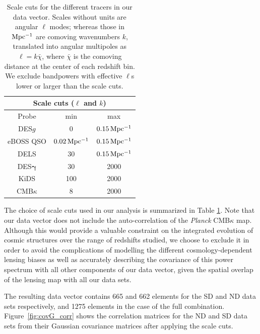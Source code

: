\documentclass[a4paper,11pt]{article}
\newcommand{\shear}{\boldsymbol{\gamma}}
\newcommand{\cmbk}{CMB$\kappa$\xspace}
\newcommand{\desgc}{DES$g$\xspace}
\newcommand{\deswl}{DES$\shear$\xspace}
\newcommand{\kids}{KiDS\xspace}
\newcommand{\planck}{{\sl Planck}\xspace}
\newcommand{\dls}{DELS\xspace}
\newcommand{\northd}{ND\xspace}
\newcommand{\southd}{SD\xspace}
\begin{document}
      \begin{table}
        \centering
        \def\arraystretch{1.2}
        \begin{tabular}{|ccc|}
        \hline
        \multicolumn{3}{|c|}{\textbf{Scale cuts ($\ell$ and $k$)}} \\
        \hline
        Probe &  min  & max\\  
        \hline 
        \desgc & 0 & $\unit[0.15]{Mpc^{-1}}$\\
        eBOSS QSO & $\unit[0.02]{Mpc^{-1}}$ & $\unit[0.15]{Mpc^{-1}}$\\
            \dls & 30 & $\unit[0.15]{Mpc^{-1}}$\\
        \deswl & 30 & 2000\\
        \kids & 100 & 2000\\
        \cmbk & 8 & 2000\\
        \hline
        \end{tabular}
        \caption{Scale cuts for the different tracers in our data vector. Scales without units are angular $\ell$ modes; whereas those in $\unit[]{Mpc^{-1}}$ are comoving wavenumbers $k$, translated into angular multipoles as $\ell=k\bar{\chi}$, where $\bar{\chi}$ is the comoving distance at the center of each redshift bin. We exclude bandpowers with effective $\ell$s lower or larger than the scale cuts.}\label{tab:scale_cuts}
      \end{table}
      
      The choice of scale cuts used in our analysis is summarized in Table \ref{tab:scale_cuts}. Note that our data vector does not include the auto-correlation of the \planck \cmbk map. Although this would provide a valuable constraint on the integrated evolution of cosmic structures over the range of redshifts studied, we choose to exclude it in order to avoid the complications of modelling the different cosmology-dependent lensing biases \cite{1611.09753,1807.06210} as well as accurately describing the covariance of this power spectrum with all other components of our data vector, given the spatial overlap of the lensing map with all our data sets.
      
      The resulting data vector contains 665 and 662 elements for the \southd and \northd data sets respectively, and 1275 elements in the case of the full combination. Figure~\ref{fig:covG_corr} shows the correlation matrices for the \northd and \southd data sets from their Gaussian covariance matrices after applying the scale cuts.
      
\end{document}
